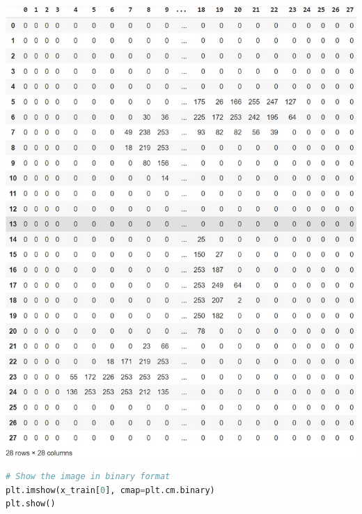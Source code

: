 \documentclass{book}
\begin{document}
\begin{center}
    \includegraphics[scale=0.2]{chapter 7/ch7_figure13.jpeg}
\end{center}
\begin{lstlisting}[language=Python, basicstyle=\ttfamily\small, keywordstyle=\color{blue}, commentstyle=\color{forestgreen}, stringstyle=\color{red}, showstringspaces=false]
# Show the image in binary format
plt.imshow(x_train[0], cmap=plt.cm.binary)
plt.show()
\end{lstlisting}
\end{document}
